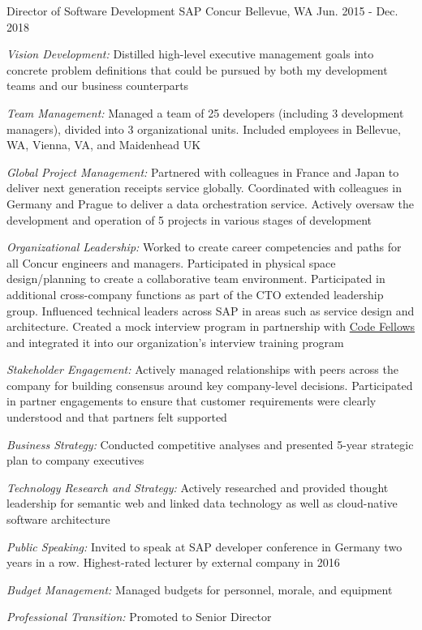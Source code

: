 \begin{cventries}
\cventry
{Director of Software Development} %
{SAP Concur} %
{Bellevue, WA} %
{Jun. 2015 - Dec. 2018} %
{ %
\begin{cvitems}
\item {\emph{Vision Development:} Distilled high-level executive management goals into concrete problem definitions that could be pursued by both my development teams and our business counterparts }
\item {\emph{Team Management:} Managed a team of 25 developers (including 3 development managers), divided into 3 organizational units. Included employees in Bellevue, WA, Vienna, VA, and Maidenhead UK }
\item {\emph{Global Project Management:} Partnered with colleagues in France and Japan to deliver next generation receipts service globally. Coordinated with colleagues in Germany and Prague to deliver a data orchestration service. Actively oversaw the development and operation of 5 projects in various stages of development }
\item {\emph{Organizational Leadership:} Worked to create career competencies and paths for all Concur engineers and managers. Participated in physical space design/planning to create a collaborative team environment. Participated in additional cross-company functions as part of the CTO extended leadership group. Influenced technical leaders across SAP in areas such as service design and architecture. Created a mock interview program in partnership with \href{https://www.codefellows.org/}{Code Fellows} and integrated it into our organization’s interview training program }
\item {\emph{Stakeholder Engagement:} Actively managed relationships with peers across the company for building consensus around key company-level decisions. Participated in partner engagements to ensure that customer requirements were clearly understood and that partners felt supported }
\item {\emph{Business Strategy:} Conducted competitive analyses and presented 5-year strategic plan to company executives }
\item {\emph{Technology Research and Strategy:} Actively researched and provided thought leadership for semantic web and linked data technology as well as cloud-native software architecture }
\item {\emph{Public Speaking:} Invited to speak at SAP developer conference in Germany two years in a row. Highest-rated lecturer by external company in 2016 }
\item {\emph{Budget Management:} Managed budgets for personnel, morale, and equipment }
\item {\emph{Professional Transition:} Promoted to Senior Director }
\end{cvitems}
}


\end{cventries}
